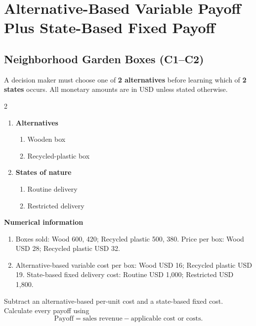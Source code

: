\section{Alternative-Based Variable Payoff Plus State-Based Fixed Payoff}
\label{sec:alternative-based-variable-payoff-plus-state-based-fixed-payoff}
\subsection{Neighborhood Garden Boxes (C1--C2)}
\label{sec:problem15-neighborhood-garden-boxes-c1-c2}
A decision maker must choose one of \textbf{2 alternatives} before learning which of \textbf{2 states} occurs. All monetary amounts are in USD unless stated otherwise.
\begin{multicols}{2}
\begin{enumerate}[label=\arabic*.]
 \item \textbf{Alternatives}
 \begin{enumerate}[label=\roman*)]
  \item Wooden box
  \item Recycled-plastic box
 \end{enumerate}
 \item \textbf{States of nature}
 \begin{enumerate}[label=\roman*)]
  \item Routine delivery
  \item Restricted delivery
 \end{enumerate}
\end{enumerate}
\end{multicols}
 \textbf{Numerical information}
 \begin{enumerate}[label=\roman*)]
  \item Boxes sold: Wood 600, 420; Recycled plastic 500, 380. Price per box: Wood USD 28; Recycled plastic USD 32.
  \item Alternative-based variable cost per box: Wood USD 16; Recycled plastic USD 19. State-based fixed delivery cost: Routine USD 1,000; Restricted USD 1,800.
 \end{enumerate}
Subtract an alternative-based per-unit cost and a state-based fixed cost. Calculate every payoff using
\[
 \text{Payoff}=\text{sales revenue}-\text{applicable cost or costs}.
\]

